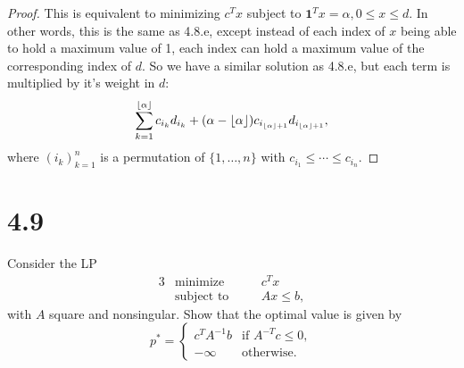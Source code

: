 \documentclass[12pt]{article}
\DeclarePairedDelimiter\floor{\lfloor}{\rfloor}
\begin{document}
\begin{proof}
    This is equivalent to minimizing $c^Tx$ subject to $\textbf{1}^Tx=\alpha, 0\leq x \leq d$. In other words, this is the same as 4.8.e, except instead of each index of $x$ being able to hold a maximum value of 1, each index can hold a maximum value of the corresponding index of $d$. So we have a similar solution as 4.8.e, but each term is multiplied by it's weight in $d$:
    \[\sum_{k=1}^{\floor{\alpha}}c_{i_k}d_{i_k} + (\alpha - \floor{\alpha})c_{i_{\floor{\alpha}+1}}d_{i_{\floor{\alpha}+1}},\]
    where $(i_k)_{k=1}^n$ is a permutation of $\{1,\dots,n\}$ with $c_{i_1}\leq\cdots\leq c_{i_n}$.
    
\end{proof}

\section*{4.9}
Consider the LP
\begin{alignat*}{3}
    &\text{minimize}    &\quad& c^Tx \\
    &\text{subject to}  &\quad& Ax\leq b,
\end{alignat*}
with $A$ square and nonsingular. Show that the optimal value is given by
\[p^*=
    \begin{cases}
        c^TA^{-1}b &\text{if } A^{-T}c \leq 0, \\
        -\infty &\text{otherwise.}
    \end{cases}
\]
\end{document}
